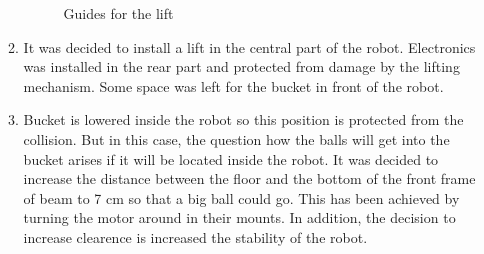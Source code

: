 \begin{enumerate}
\begin{enumerate}
\begin{figure}[H]
\begin{minipage}[h]{0.31\linewidth}
      	\end{minipage}
      	\caption{Guides for the lift}
      \end{figure}
      
      \item It was decided to install a lift in the central part of the robot. Electronics was installed in the rear part and protected from damage by the lifting mechanism. Some space was left for the bucket in front of the robot. 
       
      \item Bucket is lowered inside the robot so this position is protected from the collision. But in this case, the question how the balls will get into the bucket arises if it will be located inside the robot. It was decided to increase the distance between the floor and the bottom of the front frame of beam to 7 cm so that a big ball could go. This has been achieved by turning the motor around in their mounts. In addition, the decision to increase clearence is increased the stability of the robot.
      

\end{enumerate}
\end{enumerate}
